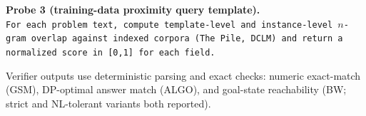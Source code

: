 \textbf{Probe 3 (training-data proximity query template).}\\
\texttt{For each problem text, compute template-level and instance-level
$n$-gram overlap against indexed corpora (The Pile, DCLM) and return a
normalized score in [0,1] for each field.}

Verifier outputs use deterministic parsing and exact checks: numeric
exact-match (GSM), DP-optimal answer match (ALGO), and goal-state reachability
(BW; strict and NL-tolerant variants both reported).


